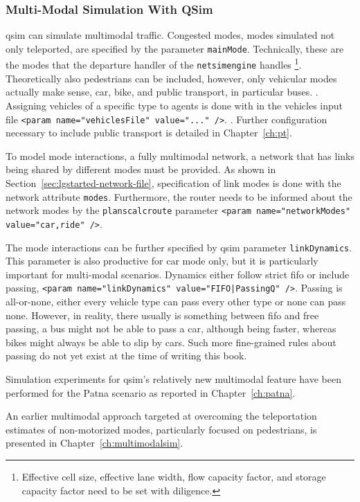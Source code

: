 \subsubsection{Multi-Modal Simulation With QSim}
\label{sec:multimodalsim_qsim}
\gls{qsim} can simulate \gls{multimodal} traffic. Congested modes, \ie modes simulated not only \gls{teleported}, are specified by the parameter \lstinline|mainMode|. Technically, these are the modes that the departure handler of the \lstinline|netsimengine| handles 
\footnote{Effective cell size, effective lane width, flow capacity factor, and storage capacity factor need to be set with diligence.}. 
Theoretically also pedestrians can be included, however, only vehicular modes actually make sense, \ie car, bike, and public transport, in particular buses. 
. 
Assigning vehicles of a specific type to agents is done with in the vehicles input file \lstinline|<param name="vehiclesFile" value="..." />|. 
. 
Further configuration necessary to include public transport is detailed in Chapter~\ref{ch:pt}.

To model mode interactions, a fully \gls{multimodal} network, \ie a network that has links being shared by different modes must be provided. 
As shown in Section~\ref{sec:lgstarted-network-file}, specification of link modes is done with the network attribute \lstinline|modes|.
Furthermore, the router needs to be informed about the network modes by the \lstinline|planscalcroute| parameter \lstinline|<param name="networkModes" value="car,ride" />|.

The mode interactions can be further specified by \gls{qsim} parameter \lstinline|linkDynamics|. 
This parameter is also productive for car mode only, but it is particularly important for multi-modal scenarios. 
Dynamics either follow strict \gls{fifo} or include passing, \ie \lstinline$<param name="linkDynamics" value="FIFO|PassingQ" />$. 
Passing is all-or-none, \ie either every vehicle type can pass every other type or none can pass none. 
However, in reality, there usually is something between \gls{fifo} and free passing, \eg a bus might not be able to pass a car, although being faster, whereas bikes might always be able to slip by cars. Such more fine-grained rules about passing do not yet exist at the time of writing this book. 

Simulation experiments for \gls{qsim}'s relatively new \gls{multimodal} feature have been performed for the Patna scenario as reported in Chapter~\ref{ch:patna}.

An earlier \gls{multimodal} approach targeted at overcoming the \gls{teleportation} estimates of non-motorized modes, particularly focused on pedestrians, is presented in Chapter~\ref{ch:multimodalsim}.


